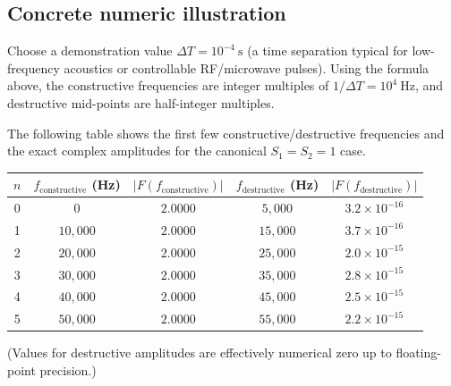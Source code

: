 \documentclass[11pt]{article}
\theoremstyle{plain}
\theoremstyle{definition}
\theoremstyle{remark}
\begin{document}
\subsection*{Concrete numeric illustration}
Choose a demonstration value \(\Delta T = 10^{-4}\ \text{s}\) (a time separation
typical for low-frequency acoustics or controllable RF/microwave pulses).
Using the formula above, the constructive frequencies are integer multiples of
\(1/\Delta T = 10^4\ \text{Hz}\), and destructive mid-points are half-integer multiples.

The following table shows the first few constructive/destructive frequencies
and the exact complex amplitudes for the canonical \(S_1=S_2=1\) case.

\begin{center}
\begin{tabular}{c c c c c}
\hline
$n$ & $f_{\text{constructive}}$ (Hz) & $|F(f_{\text{constructive}})|$ & $f_{\text{destructive}}$ (Hz) & $|F(f_{\text{destructive}})|$ \\
\hline
0 & $0$        & $2.0000$ & $5{,}000$  & $3.2\times 10^{-16}$ \\
1 & $10{,}000$ & $2.0000$ & $15{,}000$ & $3.7\times 10^{-16}$ \\
2 & $20{,}000$ & $2.0000$ & $25{,}000$ & $2.0\times 10^{-15}$ \\
3 & $30{,}000$ & $2.0000$ & $35{,}000$ & $2.8\times 10^{-15}$ \\
4 & $40{,}000$ & $2.0000$ & $45{,}000$ & $2.5\times 10^{-15}$ \\
5 & $50{,}000$ & $2.0000$ & $55{,}000$ & $2.2\times 10^{-15}$ \\
\hline
\end{tabular}
\end{center}

(Values for destructive amplitudes are effectively numerical zero up to floating-point
precision.)
\end{document}
